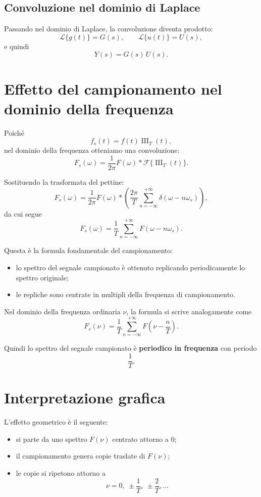 \subsection{Convoluzione nel dominio di Laplace}

Passando nel dominio di Laplace, la convoluzione diventa prodotto:
\[
\mathcal{L}\{g(t)\}=G(s), \qquad \mathcal{L}\{u(t)\}=U(s),
\]
e quindi
\[
Y(s)=G(s)\,U(s).
\]

\section{Effetto del campionamento nel dominio della frequenza}

Poiché
\[
f_s(t)=f(t)\operatorname{III}_T(t),
\]
nel dominio della frequenza otteniamo una convoluzione:
\[
F_s(\omega)=\frac{1}{2\pi}F(\omega)\ast
\mathcal{F}\{\operatorname{III}_T(t)\}.
\]

Sostituendo la trasformata del pettine:
\[
F_s(\omega)
=
\frac{1}{2\pi}
F(\omega)\ast
\left(
\frac{2\pi}{T}\sum_{n=-\infty}^{+\infty}\delta(\omega-n\omega_s)
\right),
\]
da cui segue
\[
F_s(\omega)
=
\frac{1}{T}\sum_{n=-\infty}^{+\infty} F(\omega-n\omega_s).
\]

Questa è la formula fondamentale del campionamento:
\begin{itemize}
    \item lo spettro del segnale campionato è ottenuto replicando periodicamente
    lo spettro originale;
    \item le repliche sono centrate in multipli della frequenza di campionamento.
\end{itemize}

Nel dominio della frequenza ordinaria \(\nu\), la formula si scrive analogamente come
\[
F_s(\nu)=\frac{1}{T}\sum_{n=-\infty}^{+\infty}F\!\left(\nu-\frac{n}{T}\right).
\]

Quindi lo spettro del segnale campionato è \textbf{periodico in frequenza}
con periodo
\[
\frac{1}{T}.
\]

\section{Interpretazione grafica}

L'effetto geometrico è il seguente:
\begin{itemize}
    \item si parte da uno spettro \(F(\nu)\) centrato attorno a \(0\);
    \item il campionamento genera copie traslate di \(F(\nu)\);
    \item le copie si ripetono attorno a
    \[
    \nu=0,\ \pm \frac{1}{T},\ \pm \frac{2}{T},\dots
    \]
\end{itemize}


